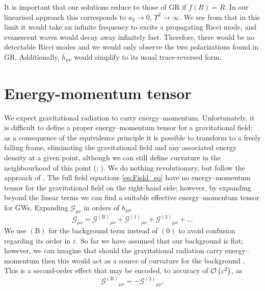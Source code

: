 It is important that our solutions reduce to those of GR if $f(R) = R$. In our linearised approach this corresponds to $a_2 \rightarrow 0$, $\Upsilon^2 \rightarrow \infty$. We see from  that in this limit it would take an infinite frequency to excite a propagating Ricci mode, and evanescent waves would decay away infinitely fast. Therefore, there would be no detectable Ricci modes and we would only observe the two polarizations found in GR. Additionally, $\overline{h}_{\mu\nu}$ would simplify to its usual trace-reversed form.

\section{Energy-momentum tensor}\label{sec:EM_tensor}

We expect gravitational radiation to carry energy--momentum. Unfortunately, it is difficult to define a proper energy--momentum tensor for a gravitational field: as a consequence of the equivalence principle it is possible to transform to a freely falling frame, eliminating the gravitational field and any associated energy density at a given point, although we can still define curvature in the neighbourhood of this point (\citealt[section 20.4]{Misner1973}; \citealt[section 17.11]{Hobson2006}). We do nothing revolutionary, but follow the approach of \citet{Isaacson1968, Isaacson1968a}. The full field equations \eqref{eq:Field_eq} have no energy--momentum tensor for the gravitational field on the right-hand side; however, by expanding beyond the linear terms we can find a suitable effective energy--momentum tensor for GWs. Expanding $\mathcal{G}_{\mu\nu}$ in orders of $h_{\mu\nu}$
\begin{equation}
\mathcal{G}_{\mu\nu} = {\mathcal{G}^{(\text{B})}}_{\mu\nu} + {\mathcal{G}^{(1)}}_{\mu\nu} + {\mathcal{G}^{(2)}}_{\mu\nu} + \ldots
\label{eq:G_exp}
\end{equation}
We use $(\text{B})$ for the background term instead of $(0)$ to avoid confusion regarding its order in $\varepsilon$. So far we have assumed that our background is flat; however, we can imagine that should the gravitational radiation carry energy--momentum then this would act as a source of curvature for the background \citep[section 4.4b]{Wald1984}. This is a second-order effect that may be encoded, to accuracy of $\mathcal{O}\left({\varepsilon^2}\right)$, as \citep[section 15.4]{Rindler2006}
\begin{equation}
{\mathcal{G}^{(\text{B})}}_{\mu\nu} = -{\mathcal{G}^{(2)}}_{\mu\nu}.
\end{equation}
